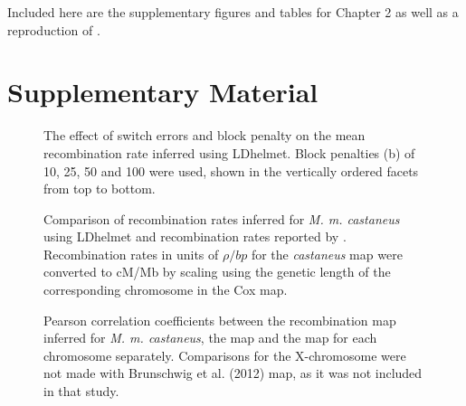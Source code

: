 
Included here are the supplementary figures and tables for Chapter 2 as well as a reproduction of \cite{RN340}.

\section{Supplementary Material}

\linespread{1}




\pagebreak 
 
 \begin{figure}
   \centering      
   \noindent{}
 \caption[The effect of block penalty on recombination rate inference]{The effect of switch errors and block penalty on the mean recombination rate inferred using LDhelmet. Block penalties (b) of 10, 25, 50 and 100 were used, shown in the vertically ordered facets from top to bottom.}
 \label{fig:S1}
\end{figure}

 
 \begin{figure}
   \centering      
   \noindent{}
 \caption[Recombination rates maps for each mouse chromosome]{Comparison of recombination rates inferred for \textit{M. m. castaneus} using LDhelmet
 and recombination rates reported by \cite{RN232}. Recombination rates in units of $\rho / bp$
 for the \textit{castaneus} map were converted to cM/Mb by scaling using the genetic length of the
 corresponding chromosome in the Cox map.}
 \label{fig:S2}
\end{figure}


 \begin{figure}
   \centering      
   \noindent{}
 \caption[Correlations between recombination maps for each chromosome]{Pearson correlation coefficients between the recombination map inferred for \textit{M. m. castaneus}, the \cite{RN156} map and the \cite{RN232} map for each chromosome separately. Comparisons for the X-chromosome were not made with Brunschwig et al. (2012) map, as it was not included in that study.}
 \label{fig:S3}
\end{figure}
 
